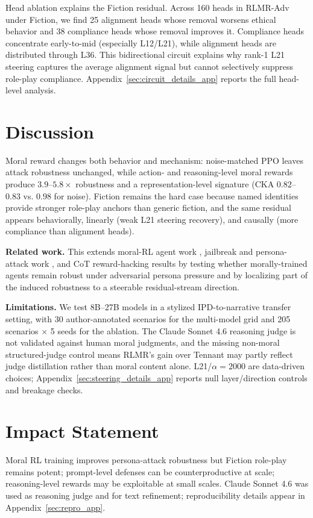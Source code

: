 \documentclass{article}
\newcommand{\rlmr}{\textnormal{RLMR}}
\begin{document}
Head ablation explains the Fiction residual. Across 160 heads in \rlmr{}-Adv under Fiction, we find 25 alignment heads whose removal worsens ethical behavior and 38 compliance heads whose removal improves it. Compliance heads concentrate early-to-mid (especially L12/L21), while alignment heads are distributed through L36. This bidirectional circuit explains why rank-1 L21 steering captures the average alignment signal but cannot selectively suppress role-play compliance. Appendix~\ref{sec:circuit_details_app} reports the full head-level analysis.


\section{Discussion}
\label{sec:discussion}

Moral reward changes both behavior and mechanism: noise-matched PPO leaves attack robustness unchanged, while action- and reasoning-level moral rewards produce $3.9$--$5.8\times$ robustness and a representation-level signature (CKA $0.82$--$0.83$ vs. $0.98$ for noise). Fiction remains the hard case because named identities provide stronger role-play anchors than generic fiction, and the same residual appears behaviorally, linearly (weak L21 steering recovery), and causally (more compliance than alignment heads).

\textbf{Related work.} This extends moral-RL agent work \citep{tennant2025moral,an2025moralreason}, jailbreak and persona-attack work \citep{wei2023jailbroken,persona2025,shen2024anything,zou2023universal,perez2022red}, and CoT reward-hacking results \citep{baker2025monitoring} by testing whether morally-trained agents remain robust under adversarial persona pressure and by localizing part of the induced robustness to a steerable residual-stream direction.

\textbf{Limitations.} We test 8B--27B models in a stylized IPD-to-narrative transfer setting, with 30 author-annotated scenarios for the multi-model grid and 205 scenarios $\times$ 5 seeds for the ablation. The Claude Sonnet 4.6 reasoning judge is not validated against human moral judgments, and the missing non-moral structured-judge control means \rlmr{}'s gain over Tennant may partly reflect judge distillation rather than moral content alone. L21/$\alpha{=}2000$ are data-driven choices; Appendix~\ref{sec:steering_details_app} reports null layer/direction controls and breakage checks.

\section*{Impact Statement}
Moral RL training improves persona-attack robustness but Fiction role-play remains potent; prompt-level defenses can be counterproductive at scale; reasoning-level rewards may be exploitable at small scales. Claude Sonnet 4.6 was used as reasoning judge and for text refinement; reproducibility details appear in Appendix~\ref{sec:repro_app}.
\end{document}
